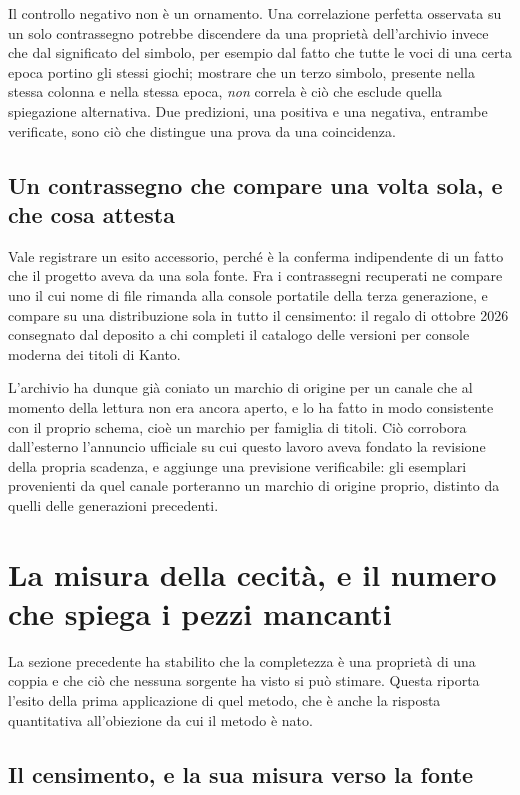 Il controllo negativo non è un ornamento. Una correlazione perfetta osservata su un solo contrassegno potrebbe discendere da una proprietà dell'archivio invece che dal significato del simbolo, per esempio dal fatto che tutte le voci di una certa epoca portino gli stessi giochi; mostrare che un terzo simbolo, presente nella stessa colonna e nella stessa epoca, \emph{non} correla è ciò che esclude quella spiegazione alternativa. Due predizioni, una positiva e una negativa, entrambe verificate, sono ciò che distingue una prova da una coincidenza.

\subsection{Un contrassegno che compare una volta sola, e che cosa attesta}

Vale registrare un esito accessorio, perché è la conferma indipendente di un fatto che il progetto aveva da una sola fonte. Fra i contrassegni recuperati ne compare uno il cui nome di file rimanda alla console portatile della terza generazione, e compare su una distribuzione sola in tutto il censimento: il regalo di ottobre 2026 consegnato dal deposito a chi completi il catalogo delle versioni per console moderna dei titoli di Kanto.

L'archivio ha dunque già coniato un marchio di origine per un canale che al momento della lettura non era ancora aperto, e lo ha fatto in modo consistente con il proprio schema, cioè un marchio per famiglia di titoli. Ciò corrobora dall'esterno l'annuncio ufficiale su cui questo lavoro aveva fondato la revisione della propria scadenza, e aggiunge una previsione verificabile: gli esemplari provenienti da quel canale porteranno un marchio di origine proprio, distinto da quelli delle generazioni precedenti.

\section{La misura della cecità, e il numero che spiega i pezzi mancanti}
\label{sec:misura-cecita}

La sezione precedente ha stabilito che la completezza è una proprietà di una coppia e che ciò che nessuna sorgente ha visto si può stimare. Questa riporta l'esito della prima applicazione di quel metodo, che è anche la risposta quantitativa all'obiezione da cui il metodo è nato.

\subsection{Il censimento, e la sua misura verso la fonte}

